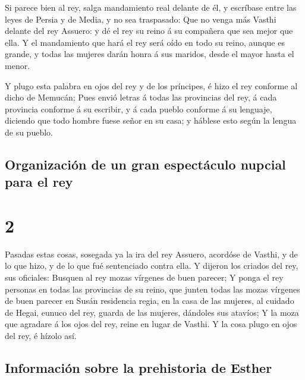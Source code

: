  Si parece bien al rey, salga mandamiento real delante de
él, y escríbase entre las leyes de Persia y de Media, y no sea
traspasado: Que no venga más Vasthi delante del rey Assuero: y dé el rey
su reino á su compañera que sea mejor que ella.  Y el
mandamiento que hará el rey será oído en todo su reino, aunque es
grande, y todas las mujeres darán honra á sus maridos, desde el mayor
hasta el menor.

 Y plugo esta palabra en ojos del rey y de los príncipes,
é hizo el rey conforme al dicho de Memucán;  Pues envió
letras á todas las provincias del rey, á cada provincia conforme á su
escribir, y á cada pueblo conforme á su lenguaje, diciendo que todo
hombre fuese señor en su casa; y háblese esto según la lengua de su
pueblo.

\hypertarget{organizaciuxf3n-de-un-gran-espectuxe1culo-nupcial-para-el-rey}{%
\subsection{Organización de un gran espectáculo nupcial para el
rey}\label{organizaciuxf3n-de-un-gran-espectuxe1culo-nupcial-para-el-rey}}

\hypertarget{section-17-2}{%
\section{2}\label{section-17-2}}

 Pasadas estas cosas, sosegada ya la ira del rey Assuero,
acordóse de Vasthi, y de lo que hizo, y de lo que fué sentenciado contra
ella.  Y dijeron los criados del rey, sus oficiales:
Busquen al rey mozas vírgenes de buen parecer;  Y ponga el
rey personas en todas las provincias de su reino, que junten todas las
mozas vírgenes de buen parecer en Susán residencia regia, en la casa de
las mujeres, al cuidado de Hegai, eunuco del rey, guarda de las mujeres,
dándoles sus atavíos;  Y la moza que agradare á los ojos
del rey, reine en lugar de Vasthi. Y la cosa plugo en ojos del rey, é
hízolo así.

\hypertarget{informaciuxf3n-sobre-la-prehistoria-de-esther}{%
\subsection{Información sobre la prehistoria de
Esther}\label{informaciuxf3n-sobre-la-prehistoria-de-esther}}

